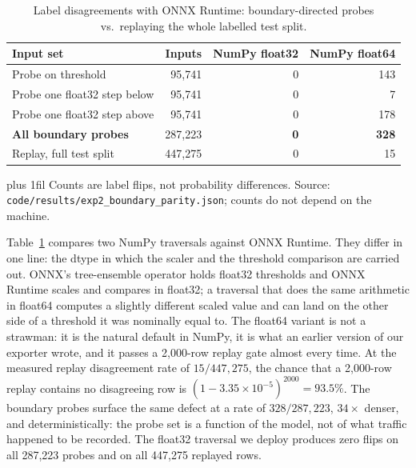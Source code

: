 \documentclass[runningheads]{llncs}
\newcommand{\tabnote}[1]{%
  \vspace{4pt}\par\noindent
  \begin{minipage}{\textwidth}%
    \footnotesize\parindent=0pt\leftskip=0pt\rightskip=0pt\parfillskip=0pt plus 1fil\relax
    #1%
  \end{minipage}}
\begin{document}
\begin{table}[htbp]
  \caption{Label disagreements with ONNX Runtime: boundary-directed probes vs.\ replaying the whole labelled test split.}
  \label{tab:boundary}
  \centering
  \small
  \begin{tabular}{l r r r}
    \toprule
    Input set & Inputs & NumPy float32 & NumPy float64 \\
    \midrule
    Probe on threshold          & 95{,}741  & 0 & 143 \\
    Probe one float32 step below & 95{,}741  & 0 & 7 \\
    Probe one float32 step above & 95{,}741  & 0 & 178 \\
    \textbf{All boundary probes} & 287{,}223 & \textbf{0} & \textbf{328} \\
    \midrule
    Replay, full test split      & 447{,}275 & 0 & 15 \\
    \bottomrule
  \end{tabular}
  \tabnote{Counts are label flips, not probability differences. Source: \texttt{code/results/exp2\_boundary\_parity.json}; counts do not depend on the machine.}
\end{table}

Table~\ref{tab:boundary} compares two NumPy traversals against ONNX Runtime. They differ in one line: the dtype in which the scaler and the threshold comparison are carried out. ONNX's tree-ensemble operator holds float32 thresholds and ONNX Runtime scales and compares in float32; a traversal that does the same arithmetic in float64 computes a slightly different scaled value and can land on the other side of a threshold it was nominally equal to. The float64 variant is not a strawman: it is the natural default in NumPy, it is what an earlier version of our exporter wrote, and it passes a 2{,}000-row replay gate almost every time. At the measured replay disagreement rate of $15/447{,}275$, the chance that a 2{,}000-row replay contains no disagreeing row is $(1 - 3.35\times10^{-5})^{2000} = 93.5\%$. The boundary probes surface the same defect at a rate of $328/287{,}223$, $34\times$ denser, and deterministically: the probe set is a function of the model, not of what traffic happened to be recorded. The float32 traversal we deploy produces zero flips on all 287{,}223 probes and on all 447{,}275 replayed rows.
\end{document}
